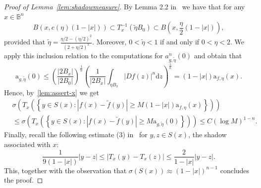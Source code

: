 \documentclass[11pt,a4paper,reqno]{amsart}
\theoremstyle{definition}
\newcommand{\B}{\mathbb{B}^n}
\newcommand{\ud}{\mathrm {d}}
\newcommand{\blue}{\color{blau}}
\newcounter{komcounter}
\numberwithin{komcounter}{section}
\newcommand{\komT}[1]{{\bf \blue [\refstepcounter{komcounter}\thekomcounter (by T): #1]}}
\begin{document}
\begin{appendix}
\begin{proof}[Proof of Lemma~\ref{lem:shadowmeasure}]
By Lemma 2.2 in~\cite{ag2} we have that for any $x\in \B$
\[
B(x, c (\eta) (1-|x|)) \subset T_x^{-1} (\tilde{\eta} B_0) \subset B(x, \frac{\eta}{2} (1-|x|)),
\]	
provided that $\tilde{\eta}=\frac{\eta/2-(\eta/2)^2}{(2+\eta/2)^2}$. Moreover, $0<\tilde{\eta}<1$ if and only if $0<\eta<2$. We apply this inclusion relation to the computations for $a_{g,\tilde{\eta}}^n (0)$ and obtain that
\[
\mathrm a_{g,\tilde{\eta}} (0) \leq \left(\frac{|2B_x|}{|2B_0|}\right)^{\frac1n} \left(\frac{1}{|2B_x|}\int_{\eta B_x} |Df(z)|^n \ud z\right)^{\frac1n}=(1-|x|) \mathrm a_{f,\eta}(x).
\]
Hence, by~\eqref{lem:assert-x} we get
\begin{align*}
&\sigma\left(T_x\left(\left\{y\in S(x):|f(x)-\tilde{f}(y)| \geq M(1-|x|)\mathrm a_{f,\eta} (x)\right\}\right)\right) \\
& \leq \sigma\left(T_x\left(\left\{y\in S(x):|f(x)-\tilde{f}(y)|\geq M\mathrm a_{g,\tilde{\eta}} (0)\right\}\right)\right)\leq C (\log M)^{1-n}.
\end{align*}
Finally, recall the following estimate (3) in~\cite{z} for $y,z\in S(x)$, the shadow associated with $x$:
\[
	\frac{1}{9(1-|x|)} |y-z|\leq |T_x(y)-T_x(z)|\leq \frac{2}{1-|x|} |y-z|.
\]
This, together with the observation that $\sigma(S(x)) \approx (1-|x|)^{n-1}$ concludes the proof.
	
\end{proof}


\end{appendix}
\end{document}
